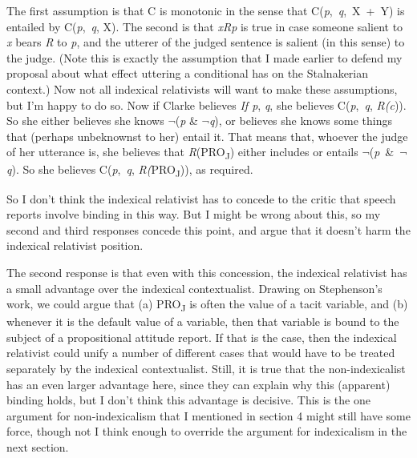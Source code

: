 \documentclass[
  11pt,
  letterpaper,
  DIV=11,
  numbers=noendperiod,
  oneside]{scrartcl}
\begin{document}
The first assumption is that C is monotonic in the sense that
C(\emph{p},~\emph{q},~X~+~Y) is entailed by C(\emph{p},~\emph{q}, X).
The second is that \emph{xRp} is true in case someone salient to
\emph{x} bears \emph{R} to \emph{p}, and the utterer of the judged
sentence is salient (in this sense) to the judge. (Note this is exactly
the assumption that I made earlier to defend my proposal about what
effect uttering a conditional has on the Stalnakerian context.) Now not
all indexical relativists will want to make these assumptions, but I'm
happy to do so. Now if Clarke believes \emph{If p}, \emph{q}, she
believes C(\emph{p},~\emph{q}, \emph{R(c})). So she either believes she
knows \(\neg\)(\emph{p} \& \(\neg\)\emph{q}), or believes she knows some
things that (perhaps unbeknownst to her) entail it. That means that,
whoever the judge of her utterance is, she believes that
\emph{R}(PRO\textsubscript{J}) either includes or entails
\(\neg\)(\emph{p}~\&~\(\neg\)\emph{q}). So she believes
C(\emph{p},~\emph{q}, \emph{R(}PRO\textsubscript{J})), as required.

So I don't think the indexical relativist has to concede to the critic
that speech reports involve binding in this way. But I might be wrong
about this, so my second and third responses concede this point, and
argue that it doesn't harm the indexical relativist position.

The second response is that even with this concession, the indexical
relativist has a small advantage over the indexical contextualist.
Drawing on Stephenson's work, we could argue that (a)
PRO\textsubscript{J} is often the value of a tacit variable, and (b)
whenever it is the default value of a variable, then that variable is
bound to the subject of a propositional attitude report. If that is the
case, then the indexical relativist could unify a number of different
cases that would have to be treated separately by the indexical
contextualist. Still, it is true that the non-indexicalist has an even
larger advantage here, since they can explain why this (apparent)
binding holds, but I don't think this advantage is decisive. This is the
one argument for non-indexicalism that I mentioned in section 4 might
still have some force, though not I think enough to override the
argument for indexicalism in the next section.
\end{document}
